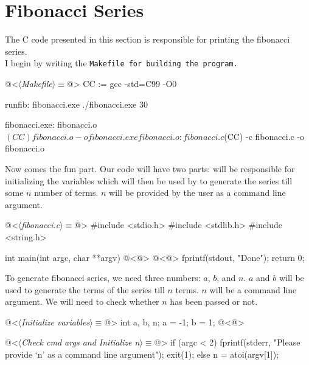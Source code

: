\section{Fibonacci Series}
The C code presented in this section is responsible for printing the fibonacci series.\\

I begin by writing the \tt Makefile \rm for building the program.
\begin{code}[Makefile]
@<$\langle$\textit{Makefile}$\rangle\equiv$@>
CC := gcc -std=C99 -O0

runfib: fibonacci.exe
    ./fibonacci.exe 30

fibonacci.exe: fibonacci.o
    $(CC) fibonacci.o -o fibonacci.exe

fibonacci.o: fibonacci.c
    $(CC) -c fibonacci.c -o fibonacci.o
\end{code}

Now comes the fun part. Our code will have two parts:  will be responsible for
initializing the variables which will then be used by  to generate
the series till some $n$ number of terms. $n$ will be provided by the user as a command line argument.

\begin{code}[fibonacci.c]
@<$\langle$\textit{fibonacci.c}$\rangle\equiv$@>
#include <stdio.h>
#include <stdlib.h>
#include <string.h>

int main(int argc, char **argv)
{
    @<@>
    @<@>
    fprintf(stdout, "Done\n");
    return 0;
}
\end{code}

To generate fibonacci series, we need three numbers: $a$, $b$, and $n$. $a$ and $b$ will be used to generate
the terms of the series till $n$ terms. $n$ will be a command line argument. We will need to check whether $n$
has been passed or not.

\begin{code}
@<$\langle$\textit{Initialize variables}$\rangle\equiv$@>
int a, b, n;
a = -1;
b = 1;
@<@>
\end{code}

\begin{code}
@<$\langle$\textit{Check cmd args and Initialize n}$\rangle\equiv$@>
if (argc < 2) {
    fprintf(stderr, "Please provide `n' as a command line argument\n");
    exit(1);
}
else {
    n = atoi(argv[1]);
}
\end{code}

